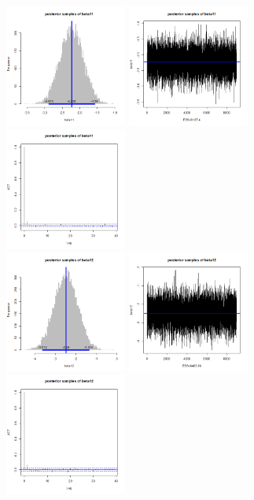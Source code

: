 \documentclass{article}
\begin{document}
\begin{figure}[!h]
    \centering
    \includegraphics[width=4cm]{beta11_hist.png}
    \includegraphics[width=4cm]{beta11_traceplot.png}
    \includegraphics[width=4cm]{beta11_acf.png} \\
    \includegraphics[width=4cm]{beta12_hist.png}
    \includegraphics[width=4cm]{beta12_traceplot.png}
    \includegraphics[width=4cm]{beta12_acf.png} \\

\end{figure}
\end{document}
